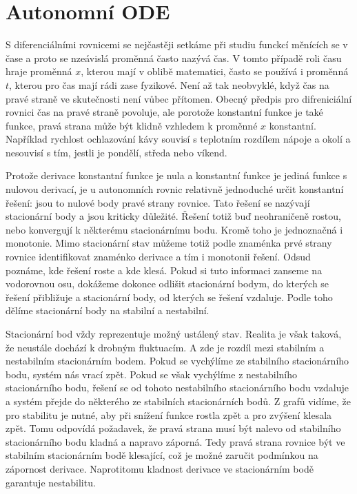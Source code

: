 \documentclass[12pt]{article}
\begin{document}
\section*{Autonomní ODE}

S diferenciálními rovnicemi se nejčastěji setkáme při studiu funckcí měnících se v čase a proto se nzeávislá proměnná často nazývá čas. V tomto případě roli času hraje proměnná $x$, kterou mají v oblibě matematici, často se používá i proměnná $t$, kterou pro čas mají rádi zase fyzikové. Není až tak neobvyklé, když čas na pravé straně ve skutečnosti není vůbec přítomen. Obecný předpis pro difreniciální rovnici čas na pravé straně povoluje, ale porotože konstantní funkce je také funkce, pravá strana může být klidně vzhledem k proměnné $x$ konstantní. Například rychlost ochlazování kávy souvisí s teplotním rozdílem nápoje a okolí a nesouvisí s tím, jestli je pondělí, středa nebo víkend.

Protože derivace konstantní funkce je nula a konstantní funkce je jediná funkce s nulovou derivací, je u autonomních rovnic relativně jednoduché určit konstantní řešení: jsou to nulové body pravé strany rovnice. Tato řešení se nazývají stacionární body a jsou kriticky důležité. Řešení totiž buď neohraničeně rostou, nebo konvergují k některému stacionárnímu bodu. Kromě toho je jednoznačná i monotonie. Mimo stacionární stav můžeme totiž podle znaménka prvé strany rovnice identifikovat znaménko derivace a tím i monotonii řešení. Odsud poznáme, kde řešení roste a kde klesá. Pokud si tuto informaci zanseme na vodorovnou osu, dokážeme dokonce odlišit stacionární bodym, do kterých se řešení přibližuje a stacionární body, od kterých se řešení vzdaluje. Podle toho dělíme stacionární body na stabilní a nestabilní.

Stacionární bod vždy reprezentuje možný ustálený stav. Realita je však taková, že neustále dochází k drobným fluktuacím. A zde je rozdíl mezi stabilním a nestabilním stacionárním bodem. Pokud se vychýlíme ze stabilního stacionárního bodu, systém nás vrací zpět. Pokud se však vychýlíme z nestabilního stacionárního bodu, řešení se od tohoto nestabilního stacionárního bodu vzdaluje a systém přejde do některého ze stabilních stacionárních bodů. Z grafů vidíme, že pro stabilitu je nutné, aby při snížení funkce rostla zpět a pro zvýšení klesala zpět. Tomu odpovídá požadavek, že pravá strana musí být nalevo od stabilního stacionárního bodu kladná a napravo záporná. Tedy pravá strana rovnice být ve stabilním stacionárním bodě klesající, což je možné zaručit podmínkou na zápornost derivace. Naprotitomu kladnost derivace ve stacionárním bodě garantuje nestabilitu. 
\end{document}
